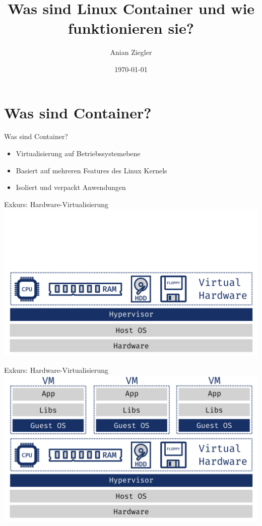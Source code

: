 \documentclass{beamer}
\title{Was sind Linux Container und wie funktionieren sie?}
\date{\today}
\author{Anian Ziegler}
\institute{cioplenu}
\begin{document}
  \maketitle
  \section{Was sind Container?}
  \begin{frame}{Was sind Container?}
    \begin{itemize}[<+->]
      \item \alert<4>{Virtualisierung auf Betriebssystemebene}
      \item Basiert auf mehreren Features des Linux Kernels
      \item Isoliert und verpackt Anwendungen
    \end{itemize}
  \end{frame}
  
  \begin{frame}{Exkurs: Hardware-Virtualisierung}
    \includegraphics[width=\textwidth]{hypervisor}
  \end{frame}
  \begin{frame}{Exkurs: Hardware-Virtualisierung}
    \includegraphics[width=\textwidth]{vms}
  \end{frame}
  
\end{document}
